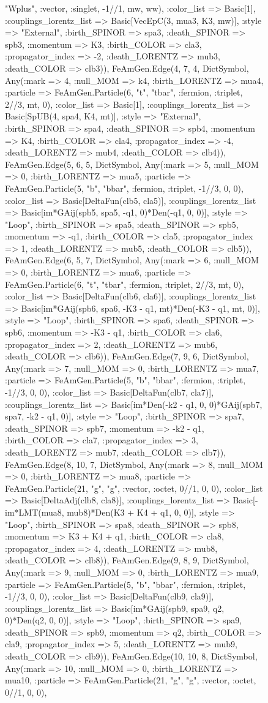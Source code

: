 \documentclass{revtex4}
\begin{document}
\begin{figure}[!htb]
\begin{center}
{"Wplus", :vector, :singlet, -1//1, mw, ww), :color_list => Basic[1], :couplings_lorentz_list => Basic[VecEpC(3, mua3, K3, mw)], :style => "External", :birth_SPINOR => spa3, :death_SPINOR => spb3, :momentum => K3, :birth_COLOR => cla3, :propagator_index => -2, :death_LORENTZ => mub3, :death_COLOR => clb3)), FeAmGen.Edge(4, 7, 4, Dict{Symbol, Any}(:mark => 4, :null_MOM => k4, :birth_LORENTZ => mua4, :particle => FeAmGen.Particle(6, "t", "tbar", :fermion, :triplet, 2//3, mt, 0), :color_list => Basic[1], :couplings_lorentz_list => Basic[SpUB(4, spa4, K4, mt)], :style => "External", :birth_SPINOR => spa4, :death_SPINOR => spb4, :momentum => K4, :birth_COLOR => cla4, :propagator_index => -4, :death_LORENTZ => mub4, :death_COLOR => clb4)), FeAmGen.Edge(5, 6, 5, Dict{Symbol, Any}(:mark => 5, :null_MOM => 0, :birth_LORENTZ => mua5, :particle => FeAmGen.Particle(5, "b", "bbar", :fermion, :triplet, -1//3, 0, 0), :color_list => Basic[DeltaFun(clb5, cla5)], :couplings_lorentz_list => Basic[im*GAij(spb5, spa5, -q1, 0)*Den(-q1, 0, 0)], :style => "Loop", :birth_SPINOR => spa5, :death_SPINOR => spb5, :momentum => -q1, :birth_COLOR => cla5, :propagator_index => 1, :death_LORENTZ => mub5, :death_COLOR => clb5)), FeAmGen.Edge(6, 5, 7, Dict{Symbol, Any}(:mark => 6, :null_MOM => 0, :birth_LORENTZ => mua6, :particle => FeAmGen.Particle(6, "t", "tbar", :fermion, :triplet, 2//3, mt, 0), :color_list => Basic[DeltaFun(clb6, cla6)], :couplings_lorentz_list => Basic[im*GAij(spb6, spa6, -K3 - q1, mt)*Den(-K3 - q1, mt, 0)], :style => "Loop", :birth_SPINOR => spa6, :death_SPINOR => spb6, :momentum => -K3 - q1, :birth_COLOR => cla6, :propagator_index => 2, :death_LORENTZ => mub6, :death_COLOR => clb6)), FeAmGen.Edge(7, 9, 6, Dict{Symbol, Any}(:mark => 7, :null_MOM => 0, :birth_LORENTZ => mua7, :particle => FeAmGen.Particle(5, "b", "bbar", :fermion, :triplet, -1//3, 0, 0), :color_list => Basic[DeltaFun(clb7, cla7)], :couplings_lorentz_list => Basic[im*Den(-k2 - q1, 0, 0)*GAij(spb7, spa7, -k2 - q1, 0)], :style => "Loop", :birth_SPINOR => spa7, :death_SPINOR => spb7, :momentum => -k2 - q1, :birth_COLOR => cla7, :propagator_index => 3, :death_LORENTZ => mub7, :death_COLOR => clb7)), FeAmGen.Edge(8, 10, 7, Dict{Symbol, Any}(:mark => 8, :null_MOM => 0, :birth_LORENTZ => mua8, :particle => FeAmGen.Particle(21, "g", "g", :vector, :octet, 0//1, 0, 0), :color_list => Basic[DeltaAdj(clb8, cla8)], :couplings_lorentz_list => Basic[-im*LMT(mua8, mub8)*Den(K3 + K4 + q1, 0, 0)], :style => "Loop", :birth_SPINOR => spa8, :death_SPINOR => spb8, :momentum => K3 + K4 + q1, :birth_COLOR => cla8, :propagator_index => 4, :death_LORENTZ => mub8, :death_COLOR => clb8)), FeAmGen.Edge(9, 8, 9, Dict{Symbol, Any}(:mark => 9, :null_MOM => 0, :birth_LORENTZ => mua9, :particle => FeAmGen.Particle(5, "b", "bbar", :fermion, :triplet, -1//3, 0, 0), :color_list => Basic[DeltaFun(clb9, cla9)], :couplings_lorentz_list => Basic[im*GAij(spb9, spa9, q2, 0)*Den(q2, 0, 0)], :style => "Loop", :birth_SPINOR => spa9, :death_SPINOR => spb9, :momentum => q2, :birth_COLOR => cla9, :propagator_index => 5, :death_LORENTZ => mub9, :death_COLOR => clb9)), FeAmGen.Edge(10, 10, 8, Dict{Symbol, Any}(:mark => 10, :null_MOM => 0, :birth_LORENTZ => mua10, :particle => FeAmGen.Particle(21, "g", "g", :vector, :octet, 0//1, 0, 0), }
\end{center}
\end{figure}
\end{document}
